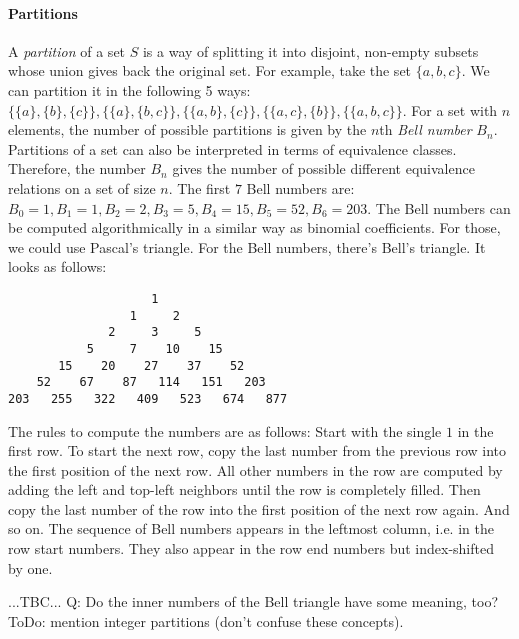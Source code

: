 \paragraph{Partitions}
A \emph{partition} of a set $S$ is a way of splitting it into disjoint, non-empty subsets whose union gives back the original set. For example, take the set $\{a,b,c\}$. We can partition it in the following 5 ways: $\{\{a\},\{b\},\{c\}\}, \{\{a\},\{b,c\}\}, \{\{a,b\},\{c\}\}, \{\{a,c\},\{b\}\}, \{\{a,b,c\}\}$. For a set with $n$ elements, the number of possible partitions is given by the $n$th \emph{Bell number} $B_n$. Partitions of a set can also be interpreted in terms of equivalence classes. Therefore, the number $B_n$ gives the number of possible different equivalence relations on a set of size $n$. The first $7$ Bell numbers are: $B_0=1, B_1=1, B_2=2, B_3=5, B_4=15, B_5=52, B_6=203$. The Bell numbers can be computed algorithmically in a similar way as binomial coefficients. For those, we could use Pascal's triangle. For the Bell numbers, there's Bell's triangle. It looks as follows:
\begin{center}  %
\begin{verbatim}
                    1
                 1     2
              2     3     5
           5     7    10    15
       15    20    27    37    52
    52    67    87   114   151   203
203   255   322   409   523   674   877
\end{verbatim}
\end{center}
The rules to compute the numbers are as follows: Start with the single $1$ in the first row. To start the next row, copy the last number from the previous row into the first position of the next row. All other numbers in the row are computed by adding the left and top-left neighbors until the row is completely filled. Then copy the last number of the row into the first position of the next row again. And so on. The sequence of Bell numbers appears in the leftmost column, i.e. in the row start numbers. They also appear in the row end numbers but index-shifted by one. 

...TBC... Q: Do the inner numbers of the Bell triangle have some meaning, too? ToDo: mention integer partitions (don't confuse these concepts).



